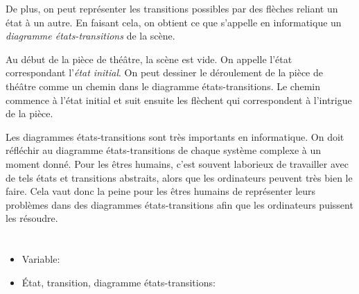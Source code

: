 {{De plus, on peut représenter les transitions possibles par des flèches reliant un état à un autre. En faisant cela, on obtient ce que s’appelle en informatique un \emph{diagramme états-transitions} de la scène.

Au début de la pièce de théâtre, la scène est vide. On appelle l’état correspondant l’\emph{état initial}. On peut dessiner le déroulement de la pièce de théâtre comme un chemin dans le diagramme états-transitions. Le chemin commence à l’état initial et suit ensuite les flèchent qui correspondent à l’intrigue de la pièce.

Les diagrammes états-transitions sont très importants en informatique. On doit réfléchir au diagramme états-transitions de chaque système complexe à un moment donné. Pour les êtres humains, c’est souvent laborieux de travailler avec de tels états et transitions abstraits, alors que les ordinateurs peuvent très bien le faire. Cela vaut donc la peine pour les êtres humains de représenter leurs problèmes dans des diagrammes états-transitions afin que les ordinateurs puissent les résoudre.



\section*{\BrochureWebsitesAndKeywords}
{\raggedright
\begin{itemize}
  \item Variable: \href{https://fr.wikipedia.org/wiki/Variable_(informatique)}{}
  \item État, transition, diagramme états-transitions: \href{https://fr.wikipedia.org/wiki/Diagramme_\%C3\%A9tats-transitions}{}
\end{itemize}


}

}{}

\def\AuthorTomcsanyiovaM{} %
\def\AuthorBezakovaD{} %
\def\AuthorTomcsanyiP{} %
\def\AuthorMohebbiH{} %
\def\AuthorKinciusV{} %
\def\AuthorDatzkoC{} %
\def\AuthorDatzkoS{} %
\def\AuthorWeigendM{} %
\def\AuthorFreiF{} %
\def\AuthorPelletE{} %

\newpage}{}
